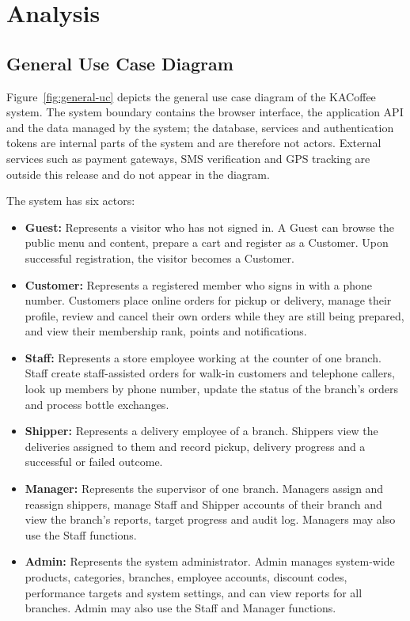 \section{Analysis}

\subsection{General Use Case Diagram}

Figure~\ref{fig:general-uc} depicts the general use case diagram of the KACoffee system. The system boundary contains the browser interface, the application API and the data managed by the system; the database, services and authentication tokens are internal parts of the system and are therefore not actors. External services such as payment gateways, SMS verification and GPS tracking are outside this release and do not appear in the diagram.


The system has six actors:

\begin{itemize}
  \item \textbf{Guest:} Represents a visitor who has not signed in. A Guest can browse the public menu and content, prepare a cart and register as a Customer. Upon successful registration, the visitor becomes a Customer.
  \item \textbf{Customer:} Represents a registered member who signs in with a phone number. Customers place online orders for pickup or delivery, manage their profile, review and cancel their own orders while they are still being prepared, and view their membership rank, points and notifications.
  \item \textbf{Staff:} Represents a store employee working at the counter of one branch. Staff create staff-assisted orders for walk-in customers and telephone callers, look up members by phone number, update the status of the branch's orders and process bottle exchanges.
  \item \textbf{Shipper:} Represents a delivery employee of a branch. Shippers view the deliveries assigned to them and record pickup, delivery progress and a successful or failed outcome.
  \item \textbf{Manager:} Represents the supervisor of one branch. Managers assign and reassign shippers, manage Staff and Shipper accounts of their branch and view the branch's reports, target progress and audit log. Managers may also use the Staff functions.
  \item \textbf{Admin:} Represents the system administrator. Admin manages system-wide products, categories, branches, employee accounts, discount codes, performance targets and system settings, and can view reports for all branches. Admin may also use the Staff and Manager functions.
\end{itemize}

